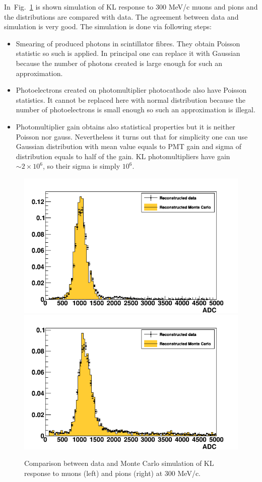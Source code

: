 In~Fig.~\ref{fig:KL_mc_vs_data} is shown simulation of KL response to 300 MeV/c muons and pions and the distributions are compared with data. The agreement between data and simulation is very good. The simulation is done via following steps:

\begin{itemize}
	\item Smearing of produced photons in scintillator fibres. They obtain Poisson statistic so such is applied. In principal one can replace it with Gaussian because the number of photons created is  large enough for such an approximation.
	
	\item Photoelectrons created on photomultiplier photocathode also have Poisson statistics. It cannot be replaced here with normal distribution because the number of photoelectrons is small enough so such an approximation is illegal.
	
	\item Photomultiplier gain obtains also statistical properties but it is neither Poisson nor gauss. Nevertheless it turns out that for simplicity one can use Gaussian distribution with mean value equals to PMT gain and sigma of distribution equals to half of the gain. KL photomultipliers have gain $\sim 2 \times 10^6$, so their sigma is simply $10^6$.
	
\end{itemize}

   \begin{figure}
   	\begin{center}
   		\includegraphics[width=0.4\columnwidth]{./04-KL/Figures/muon_mc_vs_data.png}  		\includegraphics[width=0.4\columnwidth]{./04-KL/Figures/pion_mc_vs_data.png}
   		\caption{Comparison between data and Monte Carlo simulation of KL response to muons (left) and pions (right) at 300 MeV/c.}
   		\label{fig:KL_mc_vs_data}
   	\end{center}
   \end{figure}
